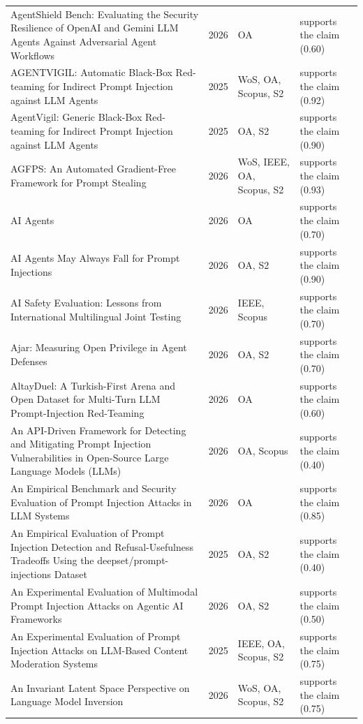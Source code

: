\begin{longtable}{@{}%
  >{\raggedright\arraybackslash}p{}c%
  >{\raggedright\arraybackslash}p{}%
  >{\raggedright\arraybackslash}p{}@{}}
AgentShield Bench: Evaluating the Security Resilience of OpenAI and Gemini LLM Agents Against Adversarial Agent Workflows & 2026 & OA & supports the claim (0.60) \\
AGENTVIGIL: Automatic Black-Box Red-teaming for Indirect Prompt Injection against LLM Agents & 2025 & WoS, OA, Scopus, S2 & supports the claim (0.92) \\
AgentVigil: Generic Black-Box Red-teaming for Indirect Prompt Injection against LLM Agents & 2025 & OA, S2 & supports the claim (0.90) \\
AGFPS: An Automated Gradient-Free Framework for Prompt Stealing & 2026 & WoS, IEEE, OA, Scopus, S2 & supports the claim (0.93) \\
AI Agents & 2026 & OA & supports the claim (0.70) \\
AI Agents May Always Fall for Prompt Injections & 2026 & OA, S2 & supports the claim (0.90) \\
AI Safety Evaluation: Lessons from International Multilingual Joint Testing & 2026 & IEEE, Scopus & supports the claim (0.70) \\
Ajar: Measuring Open Privilege in Agent Defenses & 2026 & OA, S2 & supports the claim (0.70) \\
AltayDuel: A Turkish-First Arena and Open Dataset for Multi-Turn LLM Prompt-Injection Red-Teaming & 2026 & OA & supports the claim (0.60) \\
An API-Driven Framework for Detecting and Mitigating Prompt Injection Vulnerabilities in Open-Source Large Language Models (LLMs) & 2026 & OA, Scopus & supports the claim (0.40) \\
An Empirical Benchmark and Security Evaluation of Prompt Injection Attacks in LLM Systems & 2026 & OA & supports the claim (0.85) \\
An Empirical Evaluation of Prompt Injection Detection and Refusal-Usefulness Tradeoffs Using the deepset/prompt-injections Dataset & 2025 & OA, S2 & supports the claim (0.40) \\
An Experimental Evaluation of Multimodal Prompt Injection Attacks on Agentic AI Frameworks & 2026 & OA, S2 & supports the claim (0.50) \\
An Experimental Evaluation of Prompt Injection Attacks on LLM-Based Content Moderation Systems & 2025 & IEEE, OA, Scopus, S2 & supports the claim (0.75) \\
An Invariant Latent Space Perspective on Language Model Inversion & 2026 & WoS, OA, Scopus, S2 & supports the claim (0.75) \\

\end{longtable}
